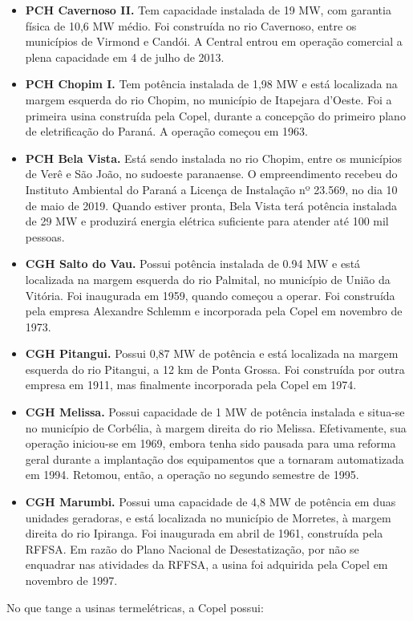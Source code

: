 \documentclass[grad,numbers]{coppe}
\begin{document}
\begin{itemize}
  \item
    \textbf{PCH Cavernoso II.} Tem capacidade instalada de 19 MW, com garantia física de 10,6 MW médio. Foi construída no rio Cavernoso, entre os municípios de Virmond e Candói. A Central entrou em operação comercial a plena capacidade em 4 de julho de 2013.
  \item
    \textbf{PCH Chopim I.} Tem potência instalada de 1,98 MW e está localizada na margem esquerda do rio Chopim, no município de Itapejara d'Oeste. Foi a primeira usina construída pela Copel, durante a concepção do primeiro plano de eletrificação do Paraná. A operação começou em 1963.
  \item
    \textbf{PCH Bela Vista.} Está sendo instalada no rio Chopim, entre os municípios de Verê e São João, no sudoeste paranaense. O empreendimento recebeu do Instituto Ambiental do Paraná a Licença de Instalação nº 23.569, no dia 10 de maio de 2019. Quando estiver pronta, Bela Vista terá potência instalada de 29 MW e produzirá energia elétrica suficiente para atender até 100 mil pessoas.
  \item
    \textbf{CGH Salto do Vau.} Possui potência instalada de 0.94 MW e está localizada na margem esquerda do rio Palmital, no município de União da Vitória. Foi inaugurada em 1959, quando começou a operar. Foi construída pela empresa Alexandre Schlemm e incorporada pela Copel em novembro de 1973.
  \item
    \textbf{CGH Pitangui.} Possui 0,87 MW de potência e está localizada na margem esquerda do rio Pitangui, a 12 km de Ponta Grossa. Foi construída por outra empresa em 1911, mas finalmente incorporada pela Copel em 1974.
  \item
    \textbf{CGH Melissa.} Possui capacidade de 1 MW de potência instalada e situa-se no município de Corbélia, à margem direita do rio Melissa. Efetivamente, sua operação iniciou-se em 1969, embora tenha sido pausada para uma reforma geral durante a implantação dos equipamentos que a tornaram automatizada em 1994. Retomou, então, a operação no segundo semestre de 1995.
  \item
    \textbf{CGH Marumbi.} Possui uma capacidade de 4,8 MW de potência em duas unidades geradoras, e está localizada no município de Morretes, à margem direita do rio Ipiranga. Foi inaugurada em abril de 1961, construída pela RFFSA. Em razão do Plano Nacional de Desestatização, por não se enquadrar nas atividades da RFFSA, a usina foi adquirida pela Copel em novembro de 1997.
  \end{itemize}
  No que tange a usinas termelétricas, a Copel possui:
\end{document}
